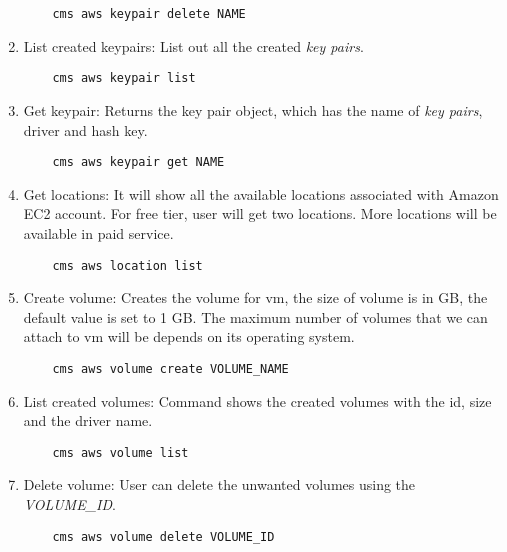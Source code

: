 \documentclass[9pt,twocolumn,twoside]{../../styles/osajnl}
\begin{document}
\begin{enumerate}
    \begin{verbatim}
    cms aws keypair delete NAME
    \end{verbatim}
    
    \item List created keypairs: List out all the created \textit{key pairs}.
    
    \begin{verbatim}
    cms aws keypair list
    \end{verbatim}
    
    \item Get keypair: Returns the key pair object, which has the name of \textit{key pairs}, driver and hash key.
    
    \begin{verbatim}
    cms aws keypair get NAME
    \end{verbatim}
    
    
    \item Get locations: It will show all the available locations associated with Amazon EC2 account. For free tier, user will get two locations. More locations will be available in paid service.
    
    \begin{verbatim}
    cms aws location list
    \end{verbatim}
    
    \item Create volume: Creates the volume for vm, the size of volume is in GB, the default value is set to 1 GB. The maximum number of volumes that we can attach to vm will be depends on its operating system.
    
    \begin{verbatim}
    cms aws volume create VOLUME_NAME
    \end{verbatim}
    
     
    \item List created volumes: Command shows the created volumes with the id, size and the driver name.
    
    \begin{verbatim}
    cms aws volume list
    \end{verbatim}
    
    \item Delete volume: User can delete the unwanted volumes using the \textit{VOLUME\_ID}.
    
    \begin{verbatim}
    cms aws volume delete VOLUME_ID
    \end{verbatim}
    

\end{enumerate}
\end{document}

